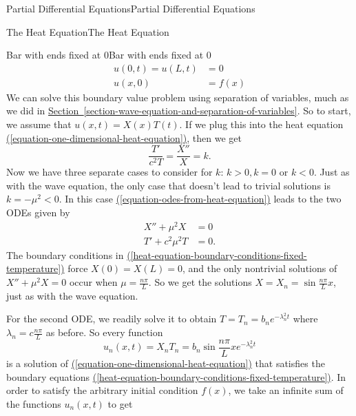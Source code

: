 \documentclass[10pt,]{book}
\numberwithin{equation}{section}
\newcommand{\lt}{<}
\newcommand{\gt}{>}
\begin{document}
\begin{chapterptx}{Partial Differential Equations}{}{Partial Differential Equations}{}{}
\begin{sectionptx}{The Heat Equation}{}{The Heat Equation}{}{}
\begin{subsectionptx}{Bar with ends fixed at \(0\)}{}{Bar with ends fixed at \(0\)}{}{}
\begin{align}
u(0,t) = u(L,t) & = 0 \label{heat-equation-boundary-conditions-fixed-temperature}\\
u(x,0) & = f(x) \label{heat-equation-initial-condition}
\end{align}
\hypertarget{p-508}{}%
We can solve this boundary value problem using separation of variables, much as we did in \hyperref[section-wave-equation-and-separation-of-variables]{Section~\ref{section-wave-equation-and-separation-of-variables}}. So to start, we assume that \(u(x,t) = X(x)T(t)\). If we plug this into the heat equation \hyperref[equation-one-dimensional-heat-equation]{(\ref{equation-one-dimensional-heat-equation})}, then we get%
%
\begin{equation}
\frac{T'}{c^{2}T} = \frac{X''}{X} = k.\label{equation-odes-from-heat-equation}
\end{equation}
\hypertarget{p-509}{}%
Now we have three separate cases to consider for \(k\): \(k\gt0, k=0\) or \(k\lt0\). Just as with the wave equation, the only case that doesn't lead to trivial solutions is \(k=-\mu^{2}\lt0\). In this case \hyperref[equation-odes-from-heat-equation]{(\ref{equation-odes-from-heat-equation})} leads to the two ODEs given by%
%
\begin{align*}
X''+\mu^{2}X & = 0 \\
T'+c^{2}\mu^{2}T & = 0. 
\end{align*}
\hypertarget{p-510}{}%
The boundary conditions in \hyperref[heat-equation-boundary-conditions-fixed-temperature]{(\ref{heat-equation-boundary-conditions-fixed-temperature})} force \(X(0) = X(L) = 0\), and the only nontrivial solutions of \(X''+\mu^{2}X = 0\) occur when \(\mu = \frac{n\pi}{L}\). So we get the solutions \(X = X_{n} = \sin\frac{n\pi}{L}x\), just as with the wave equation.%
\par
\hypertarget{p-511}{}%
For the second ODE, we readily solve it to obtain \(T = T_{n} = b_{n}e^{-\lambda_{n}^{2}t}\) where \(\lambda_{n} = c\frac{n\pi}{L}\) as before. So every function%
%
\begin{equation*}
u_{n}(x,t) = X_{n}T_{n} = b_{n}\sin\frac{n\pi}{L}xe^{-\lambda_{n}^{2}t}
\end{equation*}
\hypertarget{p-512}{}%
is a solution of \hyperref[equation-one-dimensional-heat-equation]{(\ref{equation-one-dimensional-heat-equation})} that satisfies the boundary equations \hyperref[heat-equation-boundary-conditions-fixed-temperature]{(\ref{heat-equation-boundary-conditions-fixed-temperature})}. In order to satisfy the arbitrary initial condition \(f(x)\), we take an infinite sum of the functions \(u_{n}(x,t)\) to get%

\end{subsectionptx}
\end{sectionptx}
\end{chapterptx}
\end{document}
